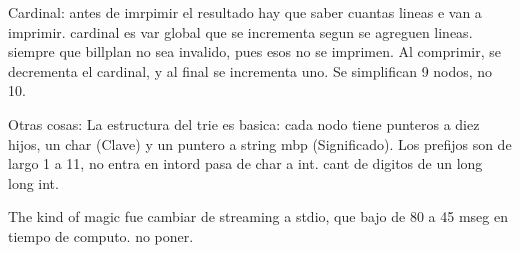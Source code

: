 Cardinal: antes de imrpimir el resultado hay que saber cuantas lineas e van a imprimir.
cardinal es var global que se incrementa segun se agreguen lineas. siempre que billplan
no sea invalido, pues esos no se imprimen. Al comprimir, se decrementa el cardinal, y al final se
incrementa uno. Se simplifican 9 nodos, no 10.


Otras cosas: La estructura del trie es basica: cada nodo tiene punteros a diez hijos, un char (Clave) y un
puntero a string mbp (Significado). Los prefijos son de largo 1 a 11, no entra en intord pasa de char a int. cant de digitos de un long long int.


The kind of magic fue cambiar de streaming a stdio, que bajo de 80 a 45 mseg en tiempo de computo. no poner.
